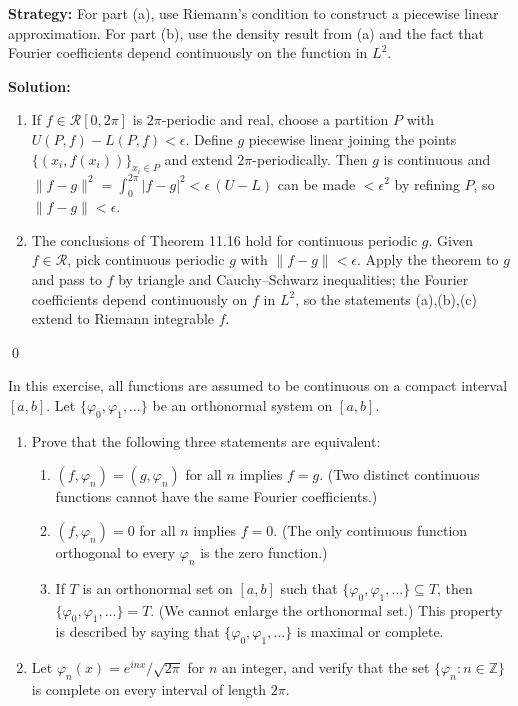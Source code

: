 \noindent\textbf{Strategy:} For part (a), use Riemann's condition to construct a piecewise linear approximation. For part (b), use the density result from (a) and the fact that Fourier coefficients depend continuously on the function in $L^2$.

\bigskip\noindent\textbf{Solution:}
\begin{enumerate}[label=(\alph*)]
\item If $f\in\mathcal R[0,2\pi]$ is $2\pi$-periodic and real, choose a partition $P$ with $U(P,f)-L(P,f)<\epsilon$. Define $g$ piecewise linear joining the points $\{(x_i,f(x_i))\}_{x_i\in P}$ and extend $2\pi$-periodically. Then $g$ is continuous and $\|f-g\|^2=\int_0^{2\pi}|f-g|^2<\epsilon\,(U-L)$ can be made $<\epsilon^2$ by refining $P$, so $\|f-g\|<\epsilon$.
\item The conclusions of Theorem 11.16 hold for continuous periodic $g$. Given $f\in\mathcal R$, pick continuous periodic $g$ with $\|f-g\|<\epsilon$. Apply the theorem to $g$ and pass to $f$ by triangle and Cauchy–Schwarz inequalities; the Fourier coefficients depend continuously on $f$ in $L^2$, so the statements (a),(b),(c) extend to Riemann integrable $f$.
\end{enumerate}\qed


\begin{problembox}
\begin{problemstatement}
In this exercise, all functions are assumed to be continuous on a compact interval $[a, b]$. Let $\{\varphi_0, \varphi_1, \dots\}$ be an orthonormal system on $[a, b]$.
\begin{enumerate}[label=(\alph*)]
\item Prove that the following three statements are equivalent:
\begin{enumerate}[label=\arabic*)]
\item $(f, \varphi_n) = (g, \varphi_n)$ for all $n$ implies $f = g$. (Two distinct continuous functions cannot have the same Fourier coefficients.)
\item $(f, \varphi_n) = 0$ for all $n$ implies $f = 0$. (The only continuous function orthogonal to every $\varphi_n$ is the zero function.)
\item If $T$ is an orthonormal set on $[a, b]$ such that $\{\varphi_0, \varphi_1, \dots\} \subseteq T$, then $\{\varphi_0, \varphi_1, \dots\} = T$. (We cannot enlarge the orthonormal set.) This property is described by saying that $\{\varphi_0, \varphi_1, \dots\}$ is maximal or complete.
\end{enumerate}
\item Let $\varphi_n(x) = e^{inx}/\sqrt{2\pi}$ for $n$ an integer, and verify that the set $\{\varphi_n : n \in \mathbb{Z}\}$ is complete on every interval of length $2\pi$.
\end{enumerate}
\end{problemstatement}
\end{problembox}

